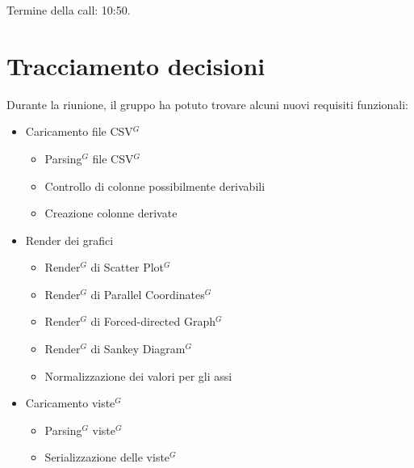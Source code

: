 \noindent Termine della call: 10:50.

\section{Tracciamento decisioni}


\noindent Durante la riunione, il gruppo ha potuto trovare alcuni nuovi requisiti funzionali: 
\begin{itemize}
	\item Caricamento file CSV$^{G}$
	\begin{itemize}
		\item Parsing$^{G}$ file CSV$^{G}$
		\item Controllo di colonne possibilmente derivabili
		\item Creazione colonne derivate
	\end{itemize}
	\item Render dei grafici
	\begin{itemize}
		\item Render$^{G}$ di Scatter Plot$^{G}$
		\item Render$^{G}$ di Parallel Coordinates$^{G}$
		\item Render$^{G}$ di Forced-directed Graph$^{G}$
		\item Render$^{G}$ di Sankey Diagram$^{G}$
		\item Normalizzazione dei valori per gli assi
	\end{itemize}
	\item Caricamento viste$^{G}$
	\begin{itemize}
		\item Parsing$^{G}$ viste$^{G}$
		\item Serializzazione delle viste$^{G}$
	\end{itemize}
\end{itemize}
